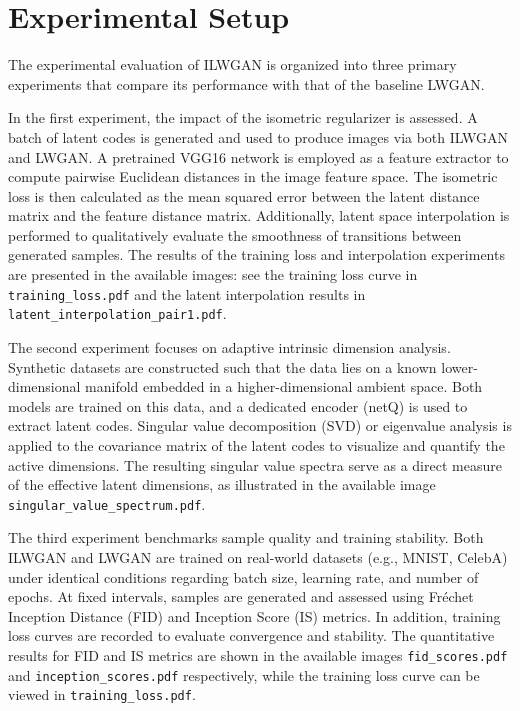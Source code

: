 \documentclass{article} %
\begin{document}
\section{Experimental Setup}
\label{sec:experimental}
The experimental evaluation of ILWGAN is organized into three primary experiments that compare its performance with that of the baseline LWGAN.

In the first experiment, the impact of the isometric regularizer is assessed. A batch of latent codes is generated and used to produce images via both ILWGAN and LWGAN. A pretrained VGG16\citep{Kravchuk2007} network is employed as a feature extractor to compute pairwise Euclidean distances in the image feature space. The isometric loss is then calculated as the mean squared error between the latent distance matrix and the feature distance matrix. Additionally, latent space interpolation is performed to qualitatively evaluate the smoothness of transitions between generated samples. The results of the training loss and interpolation experiments are presented in the available images: see the training loss curve in \texttt{training_loss.pdf} and the latent interpolation results in \texttt{latent_interpolation_pair1.pdf}.

The second experiment focuses on adaptive intrinsic dimension analysis. Synthetic datasets are constructed such that the data lies on a known lower-dimensional manifold embedded in a higher-dimensional ambient space. Both models are trained on this data, and a dedicated encoder (netQ) is used to extract latent codes. Singular value decomposition (SVD)\citep{Menze2014} or eigenvalue analysis\citep{LeCun1998} is applied to the covariance matrix of the latent codes to visualize and quantify the active dimensions. The resulting singular value spectra serve as a direct measure of the effective latent dimensions, as illustrated in the available image \texttt{singular_value_spectrum.pdf}.

The third experiment benchmarks sample quality and training stability. Both ILWGAN and LWGAN are trained on real-world datasets (e.g., MNIST, CelebA) under identical conditions regarding batch size, learning rate, and number of epochs. At fixed intervals, samples are generated and assessed using Fr\'echet Inception Distance (FID) and Inception Score (IS) metrics. In addition, training loss curves are recorded to evaluate convergence and stability. The quantitative results for FID and IS metrics are shown in the available images \texttt{fid_scores.pdf} and \texttt{inception_scores.pdf} respectively, while the training loss curve can be viewed in \texttt{training_loss.pdf}.
\end{document}
